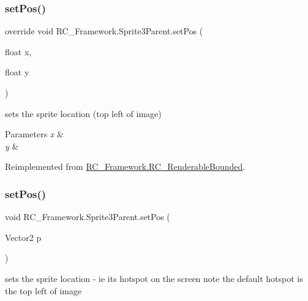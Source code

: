 \subsubsection{\texorpdfstring{set\+Pos()}{setPos()}\hspace{0.1cm}{\footnotesize\ttfamily [1/2]}}
{\footnotesize\ttfamily override void R\+C\+\_\+\+Framework.\+Sprite3\+Parent.\+set\+Pos (\begin{DoxyParamCaption}\item[{float}]{x,  }\item[{float}]{y }\end{DoxyParamCaption})\hspace{0.3cm}{\ttfamily [virtual]}}



sets the sprite location (top left of image) 


\begin{DoxyParams}{Parameters}
{\em x} & \\
\hline
{\em y} & \\
\hline
\end{DoxyParams}


Reimplemented from \mbox{\hyperlink{class_r_c___framework_1_1_r_c___renderable_bounded_a49d38185d66bf150677aaf9cc35eb4fa}{R\+C\+\_\+\+Framework.\+R\+C\+\_\+\+Renderable\+Bounded}}.

\mbox{\label{class_r_c___framework_1_1_sprite3_parent_a850bd371ac0c564f36f14e2bf3ada72e}} 
\subsubsection{\texorpdfstring{set\+Pos()}{setPos()}\hspace{0.1cm}{\footnotesize\ttfamily [2/2]}}
{\footnotesize\ttfamily void R\+C\+\_\+\+Framework.\+Sprite3\+Parent.\+set\+Pos (\begin{DoxyParamCaption}\item[{Vector2}]{p }\end{DoxyParamCaption})}



sets the sprite location -\/ ie its hotspot on the screen note the default hotspot is the top left of image 


